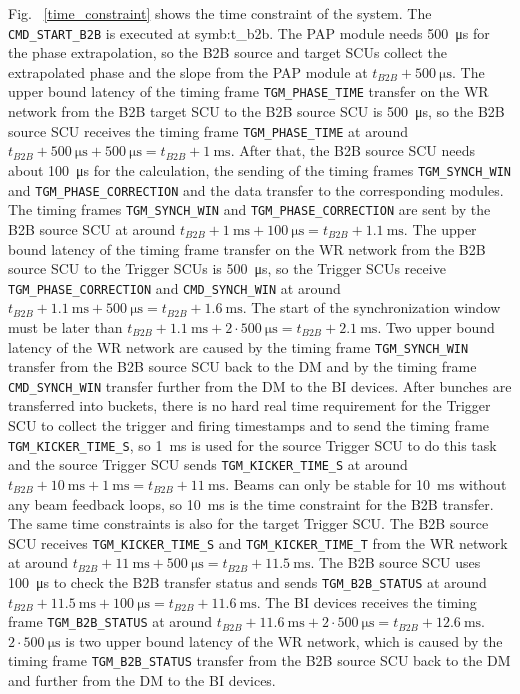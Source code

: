 Fig. ~\ref{time_constraint} shows the time constraint of the system. The \verb|CMD_START_B2B| is executed at \gls{symb:t_b2b}. The PAP module needs \SI{500}{\us} for the phase extrapolation, so the B2B source and target SCUs collect the extrapolated phase and the slope from the PAP module at $t_\mathit{B2B} + \SI{500}{\us}$. The upper bound latency of the timing frame \verb|TGM_PHASE_TIME| transfer on the WR network from the B2B target SCU to the B2B source SCU is \SI{500}{\us}, so the B2B source SCU receives the timing frame \verb|TGM_PHASE_TIME| at around $t_\mathit{B2B} + \SI{500}{\us} + \SI{500}{\us} = t_\mathit{B2B} + \SI{1}{\ms}$. After that, the B2B source SCU needs about \SI{100}{\us} for the calculation, the sending of the timing frames \verb|TGM_SYNCH_WIN| and \verb|TGM_PHASE_CORRECTION| and the data transfer to the corresponding modules. The timing frames \verb|TGM_SYNCH_WIN| and \verb|TGM_PHASE_CORRECTION| are sent by the B2B source SCU at around $t_\mathit{B2B} + \SI{1}{\ms} + \SI{100}{\us} = t_\mathit{B2B} + \SI{1.1}{\ms}$. The upper bound latency of the timing frame transfer on the WR network from the B2B source SCU to the Trigger SCUs is \SI{500}{\us}, so the Trigger SCUs receive \verb|TGM_PHASE_CORRECTION| and \verb|CMD_SYNCH_WIN| at around $t_\mathit{B2B} + \SI{1.1}{\ms} + \SI{500}{\us} = t_\mathit{B2B} + \SI{1.6}{\ms}$. The start of the synchronization window must be later than $t_\mathit{B2B} + \SI{1.1}{\ms} + 2\cdot\SI{500}{\us} = t_\mathit{B2B} + \SI{2.1}{\ms}$. Two upper bound latency of the WR network are caused by the timing frame \verb|TGM_SYNCH_WIN| transfer from the B2B source SCU back to the DM and by the timing frame \verb|CMD_SYNCH_WIN| transfer further from the DM to the BI devices. After bunches are transferred into buckets, there is no hard real time requirement for the Trigger SCU to collect the trigger and firing timestamps and to send the timing frame \verb|TGM_KICKER_TIME_S|, so \SI{1}{\ms} is used for the source Trigger SCU to do this task and the source Trigger SCU sends \verb|TGM_KICKER_TIME_S| at around $t_\mathit{B2B} + \SI{10}{\ms} + \SI{1}{\ms} = t_\mathit{B2B} + \SI{11}{\ms}$. Beams can only be stable for \SI{10}{\ms} without any beam feedback loops, so \SI{10}{\ms} is the time constraint for the B2B transfer. The same time constraints is also for the target Trigger SCU. The B2B source SCU receives \verb|TGM_KICKER_TIME_S| and \verb|TGM_KICKER_TIME_T| from the WR network at around $t_\mathit{B2B} + \SI{11}{\ms} + \SI{500}{\us} = t_\mathit{B2B} + \SI{11.5}{\ms}$. The B2B source SCU uses \SI{100}{\us} to check the B2B transfer status and sends \verb|TGM_B2B_STATUS| at around $t_\mathit{B2B} + \SI{11.5}{\ms} + \SI{100}{\us} = t_\mathit{B2B} + \SI{11.6}{\ms}$. The BI devices receives the timing frame \verb|TGM_B2B_STATUS| at around $t_\mathit{B2B} + \SI{11.6}{\ms} + 2\cdot\SI{500}{\us} = t_\mathit{B2B} + \SI{12.6}{\ms}$. $2\cdot\SI{500}{\us}$ is two upper bound latency of the WR network, which is caused by the timing frame \verb|TGM_B2B_STATUS| transfer from the B2B source SCU back to the DM and further from the DM to the BI devices.

